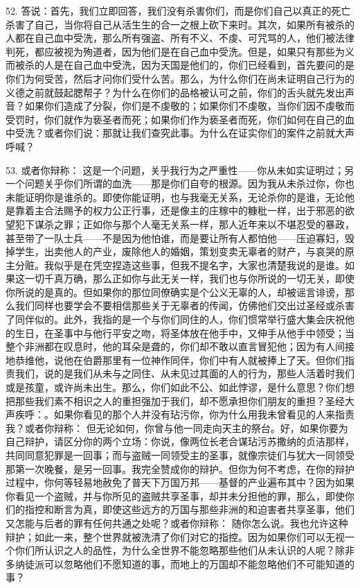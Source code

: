 52. 答说：首先，我们立即回答，我们没有杀害你们，而是你们自己以真正的死亡杀害了自己，当你将自己从活生生的合一之根上砍下来时。其次，如果所有被杀的人都在自己血中受洗，那么所有强盗、所有不义、不虔、可咒骂的人，他们被法律判死，都应被视为殉道者，因为他们是在自己血中受洗。但是，如果只有那些为义而被杀的人是在自己血中受洗，因为天国是他们的，你们已经看到，首先要问的是你们为何受苦，然后才问你们受什么苦。那么，为什么你们在尚未证明自己行为的义德之前就鼓起腮帮子？为什么在你们的品格被认可之前，你们的舌头就先发出声音？如果你们造成了分裂，你们是不虔敬的；如果你们不虔敬，当你们因不虔敬而受罚时，你们就作为亵圣者而死；如果你们作为亵圣者而死，你们如何在自己的血中受洗？或者你们说：那就让我们查究此事。为什么在证实你们的案件之前就大声呼喊？\par

53. 或者你辩称： 这是一个问题，关乎我行为之严重性——你从未如实证明过；另一个问题关乎你们所谓的血洗——那是你们自夸的根源。因为我从未杀过你，你也未能证明你是谁杀的。即使你能证明，也与我毫无关系，无论杀你的是谁，无论他是靠着主合法赐予的权力公正行事，还是像主的庄稼中的糠秕一样，出于邪恶的欲望犯下谋杀之罪；正如你与那个人毫无关系一样，那人近年来以不堪忍受的暴政，甚至带了一队士兵——不是因为他怕谁，而是要让所有人都怕他——压迫寡妇，毁掉学生，出卖他人的产业，废除他人的婚姻，策划变卖无辜者的财产，与哀哭的原主分赃。我似乎是在凭空捏造这些事，但我不提名字，大家也清楚我说的是谁。如果这一切千真万确，那么正如你与此无关一样，我们也与你所说的一切无关，即使你所说的是真的。但如果你的那位同僚确实是个公义无辜的人，却被谣言诽谤，那么我们同样也要学会不要相信那些关于无辜者的传闻，仿佛他们交出过圣经或杀害了同伴似的。此外，我指的是一个与你们同住的人，你们惯常举行盛大集会庆祝他的生日，在圣事中与他行平安之吻，将圣体放在他手中，又伸手从他手中领受；当整个非洲都在叹息时，他的耳朵是聋的，你们却不敢以直言冒犯他；因为有人间接地恭维他，说他在伯爵那里有一位神作同伴，你们中有人就被捧上了天。但你们指责我们，说的是我们从未与之同住、从未见过其面的人的行为，那些人活着时我们或是孩童，或许尚未出生。那么，你们如此不公、如此悖谬，是什么意思？你们想把那些我们素不相识之人的重担强加于我们，却不愿承担你们朋友的重担？圣经大声疾呼：。如果你看见的那个人并没有玷污你，你为什么用我未曾看见的人来指责我？或者你辩称： 但无论如何，你曾与他一同走向天主的祭台。好，如果你要为自己辩护，请区分你的两个立场：你说，像两位长老合谋玷污苏撒纳的贞洁那样，共同同意犯罪是一回事；而与盗贼一同领受主的圣事，就像宗徒们与犹大一同领受那第一次晚餐，是另一回事。我完全赞成你的辩护。但你为何不考虑，在你的辩护过程中，你何等轻易地赦免了普天下万国万邦——基督的产业遍布其中？因为如果你看见一个盗贼，并与你所见的盗贼共享圣事，却并未分担他的罪，那么，即使你们的指控和断言为真，即使这些远方的万国与那些非洲的和迫害者共享圣事，他们又怎能与后者的罪有任何共通之处呢？或者你辩称： 随你怎么说。我也允许这种辩护；如此一来，整个世界就被洗清了你们对它的指控。因为如果你们可以无视一个你们所认识之人的品性，为什么全世界不能忽略那些他们从未认识的人呢？除非多纳徒派可以忽略他们不愿知道的事，而地上的万国却不能忽略他们不可能知道的事？\par

